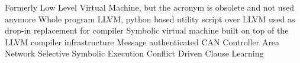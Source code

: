  {Formerly Low Level Virtual Machine, but the acronym
               is obsolete and not used anymore}
 {Whole program LLVM, python based utility script over LLVM
               used as drop-in replacement for compiler}
  {Symbolic virtual machine built on top of the LLVM compiler
               infrastructure}
 {Message authenticated CAN}
 {Controller Area Network}
 {Selective Symbolic Execution}
 {Conflict Driven Clause Learning}